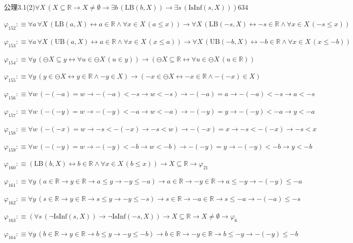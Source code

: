 \begin{fullproof}{公理3.1(2)}{$\forall X\,(X \subseteq \mathbb{R} \to X \neq \emptyset \to \exists b\,(\mathrm{LB}(b,X)) \to \exists s\,(\mathrm{IsInf}(s,X)))$}{634}
\begin{abbrevlist}
\item $\varphi_{152} :\equiv \forall a\,\forall X\,(\mathrm{LB}(a,X) \leftrightarrow a \in \mathbb{R} \land \forall x \in X\,(a \leq x)) \to \forall X\,(\mathrm{LB}(-s,X) \leftrightarrow -s \in \mathbb{R} \land \forall x \in X\,(-s \leq x))$
\item $\varphi_{153} :\equiv \forall a\,\forall X\,(\mathrm{UB}(a,X) \leftrightarrow a \in \mathbb{R} \land \forall x \in X\,(x \leq a)) \to \forall X\,(\mathrm{UB}(-b,X) \leftrightarrow -b \in \mathbb{R} \land \forall x \in X\,(x \leq -b))$
\item $\varphi_{154} :\equiv \forall y\,(\ominus X \subseteq y \leftrightarrow \forall u \in \ominus X\,(u \in y)) \to (\ominus X \subseteq \mathbb{R} \leftrightarrow \forall u \in \ominus X\,(u \in \mathbb{R}))$
\item $\varphi_{155} :\equiv \forall y\,(y \in \ominus X \leftrightarrow y \in \mathbb{R} \land -y \in X) \to (-x \in \ominus X \leftrightarrow -x \in \mathbb{R} \land -(-x) \in X)$
\item $\varphi_{156} :\equiv \forall w\,(-(-a) = w \to -(-a) < -s \to w < -s) \to -(-a) = a \to -(-a) < -s \to a < -s$
\item $\varphi_{157} :\equiv \forall w\,(-(-y) = w \to -(-y) < -a \to w < -a) \to -(-y) = y \to -(-y) < -a \to y < -a$
\item $\varphi_{158} :\equiv \forall w\,(-(-x) = w \to -s < -(-x) \to -s < w) \to -(-x) = x \to -s < -(-x) \to -s < x$
\item $\varphi_{159} :\equiv \forall w\,(-(-y) = w \to -(-y) < -b \to w < -b) \to -(-y) = y \to -(-y) < -b \to y < -b$
\item $\varphi_{160} :\equiv (\mathrm{LB}(b,X) \leftrightarrow b \in \mathbb{R} \land \forall x \in X\,(b \leq x)) \to X \subseteq \mathbb{R} \to \varphi_{21}$
\item $\varphi_{161} :\equiv \forall y\,(a \in \mathbb{R} \to y \in \mathbb{R} \to a \leq y \to -y \leq -a) \to a \in \mathbb{R} \to -y \in \mathbb{R} \to a \leq -y \to -(-y) \leq -a$
\item $\varphi_{162} :\equiv \forall y\,(s \in \mathbb{R} \to y \in \mathbb{R} \to s \leq y \to -y \leq -s) \to s \in \mathbb{R} \to -a \in \mathbb{R} \to s \leq -a \to -(-a) \leq -s$
\item $\varphi_{163} :\equiv (\forall s\,(\neg \mathrm{IsInf}(s,X)) \to \neg \mathrm{IsInf}(-s,X)) \to X \subseteq \mathbb{R} \to X \neq \emptyset \to \varphi_{6}$
\item $\varphi_{164} :\equiv \forall y\,(b \in \mathbb{R} \to y \in \mathbb{R} \to b \leq y \to -y \leq -b) \to b \in \mathbb{R} \to -y \in \mathbb{R} \to b \leq -y \to -(-y) \leq -b$

\end{abbrevlist}
\end{fullproof}
